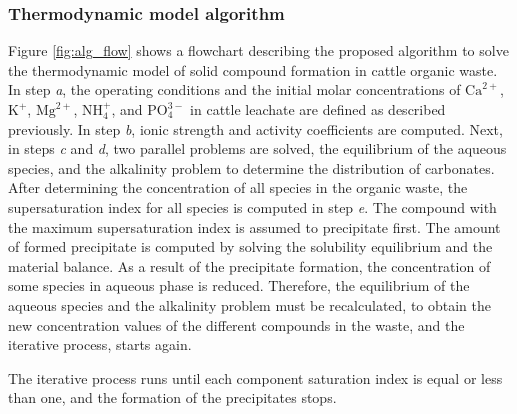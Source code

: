 \begin{refsection}[referencesCh3]
\subsubsection{Thermodynamic model algorithm}
Figure \ref{fig:alg_flow} shows a flowchart describing the proposed algorithm to solve the thermodynamic model of solid compound formation in cattle organic waste. In step \textit{a}, the operating conditions and the initial molar concentrations of $\text{Ca}^{2+}$, $\text{K}^{+}$, $\text{Mg}^{2+}$, $\text{NH}_{4}^{+}$, and $\text{PO}_{4}^{3-}$ in cattle leachate are defined as described previously. In step \emph{b}, ionic strength and activity coefficients are computed. Next, in steps \emph{c} and \emph{d}, two parallel problems are solved, the equilibrium of the aqueous species, and the alkalinity problem to determine the distribution of carbonates. After determining the concentration of all species in the organic waste, the supersaturation index for all species is computed in step \emph{e}. The compound with the maximum supersaturation index is assumed to precipitate first. The amount of formed precipitate is computed by solving the solubility equilibrium and the material balance. As a result of the precipitate formation, the concentration of some species in aqueous phase is reduced. Therefore, the equilibrium of the aqueous species and the alkalinity problem must be recalculated, to obtain the new concentration  values of the different compounds in the waste, and the iterative process, starts again.

The iterative process runs  until each component saturation index is equal or less than one, and the formation of the precipitates stops.


\end{refsection}
